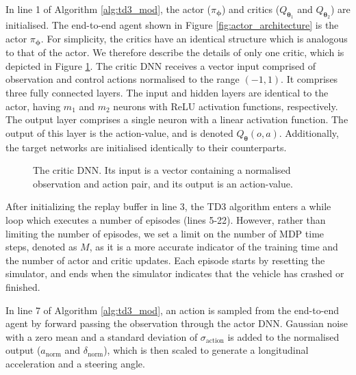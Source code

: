 In line 1 of Algorithm \ref{alg:td3_mod}, the actor ($\pi_{\bm{\phi}}$) and critics ($Q_{\bm{\theta}_1}$ and $Q_{\bm{\theta}_2}$) are initialised.
The end-to-end agent shown in Figure \ref{fig:actor_architecture} is the actor $\pi_{\bm{\phi}}$.
For simplicity, the critics have an identical structure which is analogous to that of the actor.
We therefore describe the details of only one critic, which is depicted in Figure \ref{fig:critic_architecture}.
The critic DNN receives a vector input comprised of observation and control actions normalised to the range $(-1,1)$. 
It comprises three fully connected layers.
The input and hidden layers are identical to the actor, having $m_1$ and $m_2$ neurons with ReLU activation functions, respectively.
The output layer comprises a single neuron with a linear activation function.
The output of this layer is the action-value, and is denoted $Q_{\bm{\theta}}(o,a)$.
Additionally, the target networks are initialised identically to their counterparts.

\begin{figure}[htb!]
    \centering
    
    \caption[The critic DNN]{The critic DNN. Its input is a vector containing a normalised observation and action pair, and its output is an action-value.}
    \label{fig:critic_architecture}
\end{figure}

After initializing the replay buffer in line 3, the TD3 algorithm enters a while loop which executes a number of episodes (lines 5-22). 
However, rather than limiting the number of episodes, we set a limit on the number of MDP time steps, denoted as $M$, as it is a more accurate indicator of the training time and the number of actor and critic updates. 
Each episode starts by resetting the simulator, and ends when the simulator indicates that the vehicle has crashed or finished.


In line 7 of Algorithm \ref{alg:td3_mod}, an action is sampled from the end-to-end agent by forward passing the observation through the actor DNN.
Gaussian noise with a zero mean and a standard deviation of $\sigma_{\text{action}}$ is added to the normalised output ($a_{\text{norm}}$ and $\delta_{\text{norm}}$), which is then scaled to generate a longitudinal acceleration and a steering angle.

